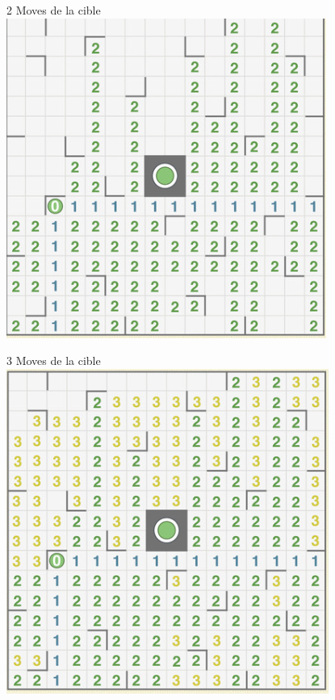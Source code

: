 \documentclass{beamer}
\begin{document}
    \begin{frame}{2 Moves de la cible}
        \centering
        \includegraphics[scale=0.45]{Images/h2.png}
    \end{frame} 
    \begin{frame}{3 Moves de la cible}
        \centering
        \includegraphics[scale=0.45]{Images/h3.png}
    \end{frame}
\end{document}
